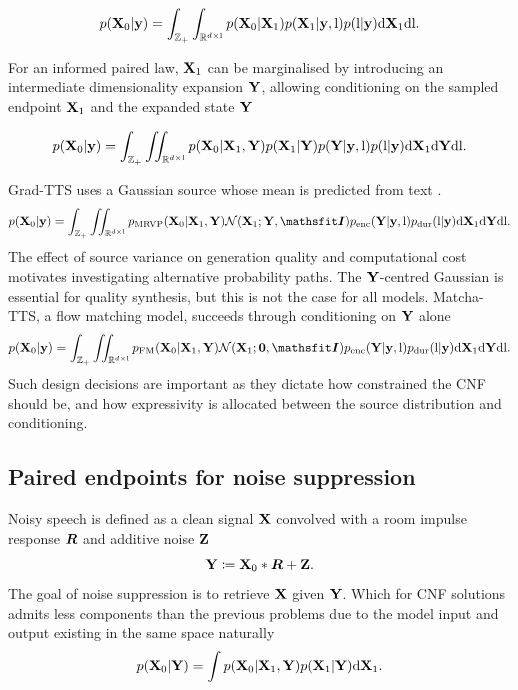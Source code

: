 \[
p({\mathbf{X}}_0|{\mathbf{y}})=\int_{{\mathbb{Z}}_+}\int_{\mathbb{R}^{d\times{\textnormal{l}}}} p({\mathbf{X}}_0|{\mathbf{X}}_1)p({\mathbf{X}}_1|{\mathbf{y}},{\textnormal{l}})p({\textnormal{l}}|{\mathbf{y}})\mathrm{d}{\mathbf{X}}_1\mathrm{d}{\textnormal{l}}.
\]

For an informed paired law, ${\mathbf{X}}_1$ can be marginalised by introducing an intermediate dimensionality expansion ${\mathbf{Y}}$, allowing conditioning on the sampled endpoint ${\mathbf{X}}_1$ and the expanded state ${\mathbf{Y}}$

\[
p({\mathbf{X}}_0|{\mathbf{y}})=\int_{{\mathbb{Z}}_+}\iint_{\mathbb{R}^{d\times{\textnormal{l}}}} p({\mathbf{X}}_0|{\mathbf{X}}_1,{\mathbf{Y}})p({\mathbf{X}}_1|{\mathbf{Y}})p({\mathbf{Y}}|{\mathbf{y}},{\textnormal{l}})p({\textnormal{l}}|{\mathbf{y}})\mathrm{d}{\mathbf{X}}_1\mathrm{d}{\mathbf{Y}}\mathrm{d}{\textnormal{l}}.
\]


Grad-TTS uses a Gaussian source whose mean is predicted from text \citep{popov21gradtts}.
\[
p(\rmX_0|\rvy)=\int_{\sZ_+}\iint_{\R^{d\times\rl}} p_\mathrm{MRVP}(\rmX_0|\rmX_1,\rmY)\gN(\rmX_1;\rmY,\tI)p_\mathrm{enc}(\rmY|\rvy,\rl)p_\mathrm{dur}(\rl|\rvy)\dd\rmX_1\dd\rmY\dd\rl.
\]
The effect of source variance on generation quality and computational cost motivates investigating alternative probability paths. The ${\mathbf{Y}}$-centred Gaussian is essential for quality synthesis, but this is not the case for all models. Matcha-TTS, a flow matching model, succeeds through conditioning on ${\mathbf{Y}}$ alone
\[
p(\rmX_0|\rvy)=\int_{\sZ_+}\iint_{\R^{d\times\rl}} p_\mathrm{FM}(\rmX_0|\rmX_1,\rmY)\gN(\rmX_1;\bm 0,\tI)p_\mathrm{enc}(\rmY|\rvy,\rl)p_\mathrm{dur}(\rl|\rvy)\dd\rmX_1\dd\rmY\dd\rl.
\]
Such design decisions are important as they dictate how constrained the CNF should be, and how expressivity is allocated between the source distribution and conditioning.

\subsection{Paired endpoints for noise suppression}

Noisy speech is defined as a clean signal ${\mathbf{X}}$ convolved with a room impulse response ${\bm{R}}$ and additive noise ${\mathbf{Z}}$
\[
{\mathbf{Y}} \coloneqq {\mathbf{X}}_0\ast{\bm{R}} + {\mathbf{Z}}.
\]
The goal of noise suppression is to retrieve ${\mathbf{X}}$ given ${\mathbf{Y}}$. Which for CNF solutions admits less components than the previous problems due to the model input and output existing in the same space naturally
\[
p({\mathbf{X}}_0|{\mathbf{Y}})=\int p({\mathbf{X}}_0|{\mathbf{X}}_1,{\mathbf{Y}})p({\mathbf{X}}_1|{\mathbf{Y}})\mathrm{d}{\mathbf{X}}_1.
\]


